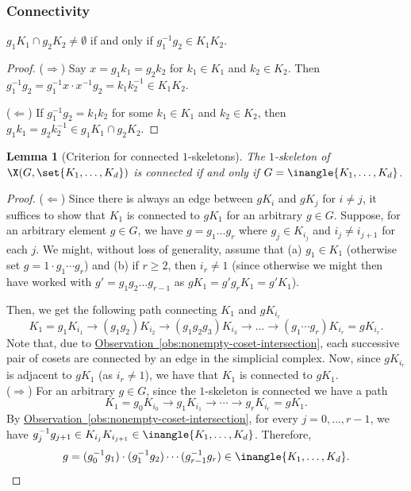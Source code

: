 \documentclass[11pt]{article}
\newcommand{\expref}[2]{\texorpdfstring{\hyperref[#2]{#1~\ref{#2}}}{#1~\ref{#2}}}
\newtheorem{lemma}[theorem]{Lemma}
\begin{document}
\subsubsection*{Connectivity}  %

\begin{observation}\label{obs:nonempty-coset-intersection}
$g_1 K_1 \cap g_2 K_2 \neq \emptyset$ if and only if $g_1^{-1} g_2 \in K_1 K_2$. 
\end{observation}
\begin{proof}
  ($\Rightarrow$) Say $x = g_1 k_1 = g_2 k_2$ for $k_1 \in K_1$ and $k_2 \in K_2$. Then $g_1^{-1} g_2 = g_1^{-1} x \cdot x^{-1} g_2 = k_1 k_2^{-1} \in K_1 K_2$.

  ($\Leftarrow$) If $g_1^{-1} g_2 = k_1 k_2$ for
some  %
$k_1 \in K_1$ and $k_2 \in K_2$, then $g_1 k_1 = g_2 k_2^{-1} \in g_1 K_1 \cap g_2 K_2$. 
\end{proof}

\begin{lemma}[Criterion for connected $1$-skeletons]\label{lem:conn-criterion}
The $1$-skeleton %
%
%
%
%
of $\X(G,\set{K_1,\ldots, K_d})$ is connected if and only if 
$G = \inangle{K_1,\ldots, K_d}$. 
\end{lemma}
\begin{proof}
  ($\Leftarrow$) Since there is always an edge between $gK_i$ and $gK_j$ for $i\neq j$, it suffices to show that $K_1$ is connected to $gK_1$ for an arbitrary $g \in G$.
Suppose, for an arbitrary element $g \in G$, we have $g = g_1 \ldots
g_r$ where $g_j \in K_{i_j}$ and $i_j \neq i_{j+1}$ for each $j$. We might, without loss of generality, assume that
(a) $g_1 \in K_1$ (otherwise set $g = 1\cdot g_1 \cdots g_r$)  and (b) if $r \geq 2$,
then $i_r \neq 1$ (since otherwise we might then have worked with $g' =
g_1g_2 \ldots g_{r-1}$ as $gK_1= g'g_r K_1 = g'K_1$).

Then, we get the following path connecting $K_1 $ and $g K_{i_r}$
  \[
    K_1 =  g_1 K_{i_1} \rightarrow (g_1 g_2) K_{i_2} \rightarrow (g_1 g_2 g_3) K_{i_3} \rightarrow \ldots \rightarrow (g_1\cdots g_r) K_{i_r} = g K_{i_r}.
  \]
  Note that, due to \expref{Observation}{obs:nonempty-coset-intersection}, each
  successive pair of cosets are connected by an edge in the simplicial
  complex. Now, since $gK_{i_r}$ is adjacent to $gK_1$ (as $i_r \neq
  1$), we have that $K_1$ is connected to $gK_1$. \\

  \noindent
  ($\Rightarrow$) For an arbitrary $g \in G$, since the $1$-skeleton is connected we have a path
  \[
    K_1 = g_0 K_{i_0} \rightarrow  g_1 K_{i_1} \rightarrow \cdots \rightarrow g_r K_{i_r} = g K_1.
  \]
  By \expref{Observation}{obs:nonempty-coset-intersection}, for every $j = 0,\ldots, r-1$, we have $g_j^{-1} g_{j+1} \in K_{i_j} K_{i_{j+1}} \in \inangle{K_1,\ldots, K_d}$.
  Therefore,
  \[
    g = (g_0^{-1} g_1) \cdot (g_1^{-1} g_2) \cdots (g_{r-1}^{-1} g_r) \in \inangle{K_1,\ldots, K_d}. \qedhere
  \]  
\end{proof}
\end{document}

